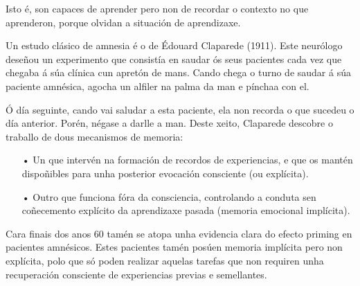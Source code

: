 \documentclass[a4paper,11pt]{article}
\begin{document}
Isto é, son capaces de aprender pero non de recordar o contexto no que aprenderon, porque olvidan a situación de aprendizaxe.

Un estudo clásico de amnesia é o de Édouard Claparede (1911). Este neurólogo deseñou un experimento que consistía en saudar ós seus pacientes cada vez que chegaba á súa clínica cun apretón de mans. Cando chega o turno de saudar á súa paciente amnésica, agocha un alfiler na palma da man e pínchaa con el.

Ó día seguinte, cando vai saludar a esta paciente, ela non recorda o que sucedeu o día anterior. Porén, négase a darlle a man. Deste xeito, Claparede descobre o traballo de dous mecanismos de memoria:
\begin{itemize}
	\item[•] Un que intervén na formación de recordos de experiencias, e que os mantén dispoñibles 			para unha posterior evocación consciente (ou explícita).
	\item[•] Outro que funciona fóra da consciencia, controlando a conduta sen coñecemento explícito 		da aprendizaxe pasada (memoria emocional implícita). 
\end{itemize}

Cara finais dos anos 60 tamén se atopa unha evidencia clara do efecto priming en pacientes amnésicos. Estes pacientes tamén posúen memoria implícita pero non explícita, polo que só poden realizar aquelas tarefas que non requiren unha recuperación consciente de experiencias previas e semellantes.

\newpage
\end{document}
